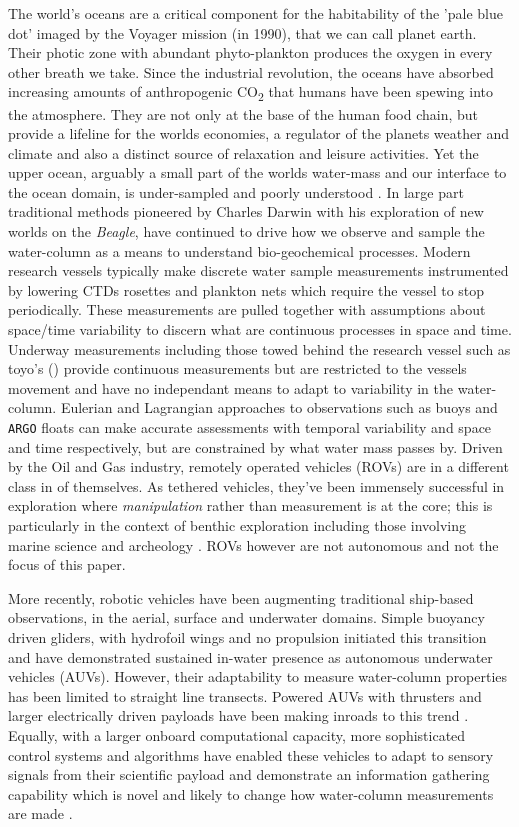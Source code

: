\documentclass[12pt]{article}
\begin{document}
The world's oceans are a critical component for the habitability of
the 'pale blue dot' imaged by the Voyager mission (in 1990), that we
can call planet earth. Their photic zone with abundant phyto-plankton
produces the oxygen in every other breath we take. Since the
industrial revolution, the oceans have absorbed increasing amounts of
anthropogenic CO\textsubscript{2} that humans have been spewing into
the atmosphere. They are not only at the base of the human food chain,
but provide a lifeline for the worlds economies, a regulator of the
planets weather and climate and also a distinct source of relaxation
and leisure activities. Yet the upper ocean, arguably a small part of
the worlds water-mass and our interface to the ocean domain, is
under-sampled and poorly understood \cite{munk2002}. In large part
traditional methods pioneered by Charles Darwin with his exploration
of new worlds on the \emph{Beagle}, have continued to drive how we
observe and sample the water-column as a means to understand
bio-geochemical processes. Modern research vessels typically make
discrete water sample measurements instrumented by lowering CTDs
rosettes and plankton nets which require the vessel to stop
periodically. These measurements are pulled together with assumptions
about space/time variability to discern what are continuous processes
in space and time. Underway measurements including those towed behind
the research vessel such as toyo's () provide continuous
measurements but are restricted to the vessels movement and have no
independant means to adapt to variability in the
water-column. Eulerian and Lagrangian approaches to observations such
as buoys and \texttt{ARGO} floats \cite{roemmich09} can make accurate
assessments with temporal variability and space and time respectively,
but are constrained by what water mass passes by. Driven by the Oil
and Gas industry, remotely operated vehicles (ROVs) are in a different
class in of themselves. As tethered vehicles, they've been immensely
successful in exploration where \emph{manipulation} rather than
measurement is at the core; this is particularly in the context of
benthic exploration including those involving marine science
\cite{yoerger00,robi17} and archeology \cite{coleman00}. ROVs however
are not autonomous and not the focus of this paper.

More recently, robotic vehicles have been augmenting traditional
ship-based observations, in the aerial, surface and underwater
domains. Simple buoyancy driven gliders, with hydrofoil wings and no
propulsion initiated this transition and have demonstrated sustained
in-water presence \cite{rucool11} as autonomous underwater vehicles
(AUVs). However, their adaptability to measure water-column properties
has been limited to straight line transects. Powered AUVs with
thrusters and larger electrically driven payloads have been making
inroads to this trend \cite{loch89,dorado2004,Bellingham07}. Equally,
with a larger onboard computational capacity, more sophisticated
control systems and algorithms have enabled these vehicles to adapt to
sensory signals from their scientific payload and demonstrate an
information gathering capability which is novel and likely to change
how water-column measurements are made
\cite{bellingham94,aosn93,ryan10,das11b,das15,fossum18,fossum18b}.
\end{document}
